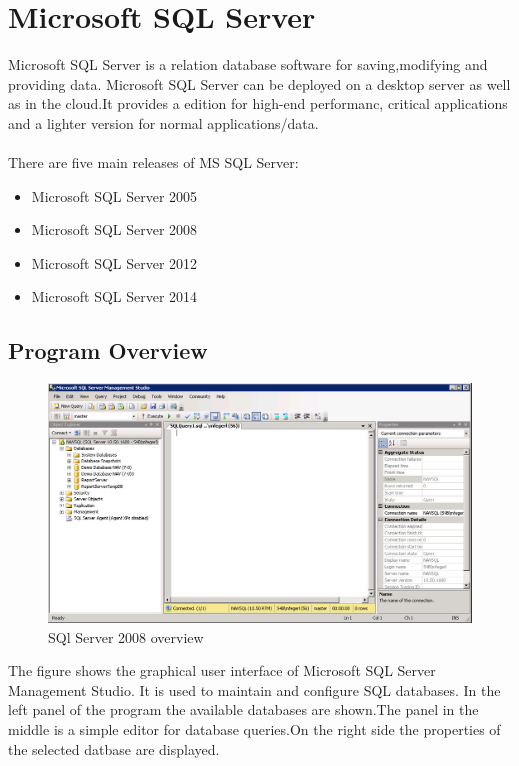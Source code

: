   \section{Microsoft SQL Server}
  Microsoft SQL Server is a relation database software for saving,modifying and providing data. Microsoft SQL Server can be deployed on a desktop server as well as in the cloud.It provides a edition for high-end performanc, critical applications and a lighter version for normal applications/data.\cite{sqlserver}
  \\\\
  There are five main releases of MS SQL Server\cite{sqlserver}:
  \begin{itemize}
          \item Microsoft SQL Server 2005
          \item Microsoft SQL Server 2008 
          \item Microsoft SQL Server 2012 
          \item Microsoft SQL Server 2014
  \end{itemize}
        
  \subsection{Program Overview}
  \begin{figure}[H]
  \centering
  \includegraphics[width=\textwidth,height=\textheight,keepaspectratio]{graphics/sqlserver.PNG}
  \caption{SQl Server 2008 overview}
  \end{figure} 

  The figure shows the graphical user interface of  Microsoft SQL Server Management Studio. It is used to maintain and configure SQL databases. In the left panel of the program the available databases are shown.The panel in the middle is a simple editor for database queries.On the right side the properties of the selected datbase are displayed.    
  \newpage
